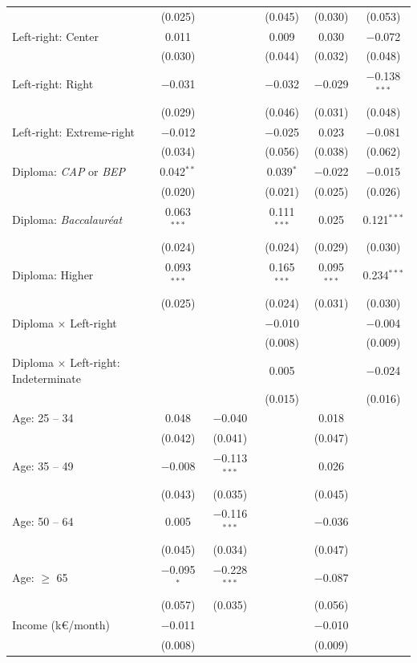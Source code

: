 \documentclass[11pt]{article}
\begin{document}
\begin{table}[!htbp]
{{\begin{tabular}{@{\extracolsep{5pt}}lccccc}
  & (0.025) &  & (0.045) & (0.030) & (0.053) \\ 
  Left-right: Center & 0.011 &  & 0.009 & 0.030 & $-$0.072 \\ 
  & (0.030) &  & (0.044) & (0.032) & (0.048) \\ 
  Left-right: Right & $-$0.031 &  & $-$0.032 & $-$0.029 & $-$0.138$^{***}$ \\ 
  & (0.029) &  & (0.046) & (0.031) & (0.048) \\ 
  Left-right: Extreme-right & $-$0.012 &  & $-$0.025 & 0.023 & $-$0.081 \\ 
  & (0.034) &  & (0.056) & (0.038) & (0.062) \\ 
  Diploma: \textit{CAP} or \textit{BEP} & 0.042$^{**}$ &  & 0.039$^{*}$ & $-$0.022 & $-$0.015 \\ 
  & (0.020) &  & (0.021) & (0.025) & (0.026) \\ 
  Diploma: \textit{Baccalauréat} & 0.063$^{***}$ &  & 0.111$^{***}$ & 0.025 & 0.121$^{***}$ \\ 
  & (0.024) &  & (0.024) & (0.029) & (0.030) \\ 
  Diploma: Higher & 0.093$^{***}$ &  & 0.165$^{***}$ & 0.095$^{***}$ & 0.234$^{***}$ \\ 
  & (0.025) &  & (0.024) & (0.031) & (0.030) \\ 
  Diploma $\times$ Left-right &  &  & $-$0.010 &  & $-$0.004 \\ 
  &  &  & (0.008) &  & (0.009) \\ 
  Diploma $\times$ Left-right: Indeterminate &  &  & 0.005 &  & $-$0.024 \\ 
  &  &  & (0.015) &  & (0.016) \\   
  Age: 25 -- 34 & 0.048 & $-$0.040 &  & 0.018 &  \\ 
  & (0.042) & (0.041) &  & (0.047) &  \\ 
  Age: 35 -- 49 & $-$0.008 & $-$0.113$^{***}$ &  & 0.026 &  \\ 
  & (0.043) & (0.035) &  & (0.045) &  \\ 
  Age: 50 -- 64 & 0.005 & $-$0.116$^{***}$ &  & $-$0.036 &  \\ 
  & (0.045) & (0.034) &  & (0.047) &  \\ 
  Age: $\geq$ 65 & $-$0.095$^{*}$ & $-$0.228$^{***}$ &  & $-$0.087 &  \\ 
  & (0.057) & (0.035) &  & (0.056) &  \\ 
  Income (k\euro{}/month) & $-$0.011 &  &  & $-$0.010 &  \\ 
  & (0.008) &  &  & (0.009) &  \\ 

\end{tabular}}}
\end{table}
\end{document}
